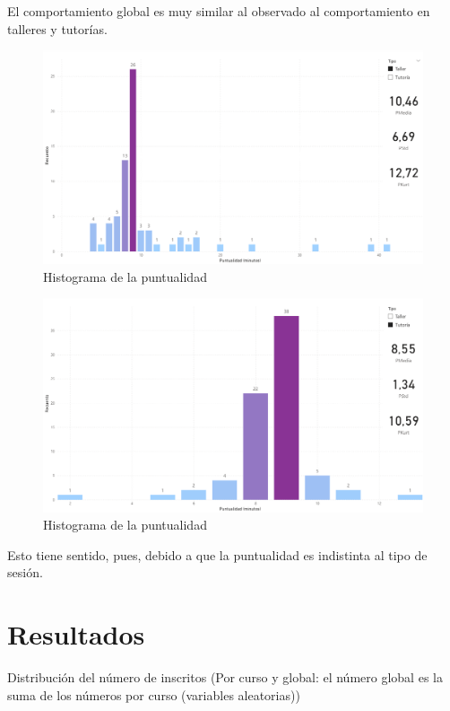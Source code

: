 \documentclass[11pt,a4paper]{book}
\theoremstyle{definition}%
\begin{document}
                El comportamiento global es muy similar al observado al comportamiento en talleres y tutorías.
                \begin{figure}[H]
                    \centering
                    \includegraphics[width=1\textwidth]{Sources/histograma_PuntualidadTaller.png}
                    \caption{Histograma de la puntualidad}
                \end{figure}
                \begin{figure}[H]
                    \centering
                    \includegraphics[width=1\textwidth]{Sources/histograma_PuntualidadTutoria.png}
                    \caption{Histograma de la puntualidad}
                \end{figure}
                Esto tiene sentido, pues, debido a que la puntualidad es indistinta al tipo de sesión.
    \chapter{Resultados}
        
        Distribución del número de inscritos (Por curso y global: el número global es la suma de los números por curso (variables aleatorias))
\end{document}
